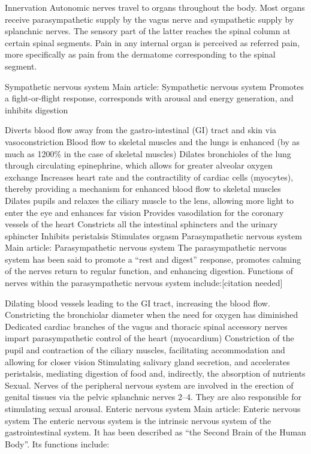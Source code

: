 \documentclass[]{book}
\begin{document}
Innervation
Autonomic nerves travel to organs throughout the body. Most organs receive parasympathetic supply by the vagus nerve and sympathetic supply by splanchnic nerves. The sensory part of the latter reaches the spinal column at certain spinal segments. Pain in any internal organ is perceived as referred pain, more specifically as pain from the dermatome corresponding to the spinal segment.

Sympathetic nervous system
Main article: Sympathetic nervous system
Promotes a fight-or-flight response, corresponds with arousal and energy generation, and inhibits digestion

Diverts blood flow away from the gastro-intestinal (GI) tract and skin via vasoconstriction
Blood flow to skeletal muscles and the lungs is enhanced (by as much as 1200\% in the case of skeletal muscles)
Dilates bronchioles of the lung through circulating epinephrine, which allows for greater alveolar oxygen exchange
Increases heart rate and the contractility of cardiac cells (myocytes), thereby providing a mechanism for enhanced blood flow to skeletal muscles
Dilates pupils and relaxes the ciliary muscle to the lens, allowing more light to enter the eye and enhances far vision
Provides vasodilation for the coronary vessels of the heart
Constricts all the intestinal sphincters and the urinary sphincter
Inhibits peristalsis
Stimulates orgasm
Parasympathetic nervous system
Main article: Parasympathetic nervous system
The parasympathetic nervous system has been said to promote a ``rest and digest'' response, promotes calming of the nerves return to regular function, and enhancing digestion. Functions of nerves within the parasympathetic nervous system include:{[}citation needed{]}

Dilating blood vessels leading to the GI tract, increasing the blood flow.
Constricting the bronchiolar diameter when the need for oxygen has diminished
Dedicated cardiac branches of the vagus and thoracic spinal accessory nerves impart parasympathetic control of the heart (myocardium)
Constriction of the pupil and contraction of the ciliary muscles, facilitating accommodation and allowing for closer vision
Stimulating salivary gland secretion, and accelerates peristalsis, mediating digestion of food and, indirectly, the absorption of nutrients
Sexual. Nerves of the peripheral nervous system are involved in the erection of genital tissues via the pelvic splanchnic nerves 2--4. They are also responsible for stimulating sexual arousal.
Enteric nervous system
Main article: Enteric nervous system
The enteric nervous system is the intrinsic nervous system of the gastrointestinal system. It has been described as ``the Second Brain of the Human Body''. Its functions include:
\end{document}
